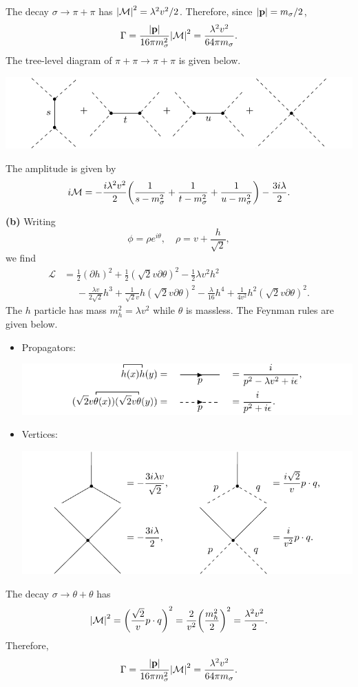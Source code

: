 \documentclass{article}
\makeatletter
\newcommand*{\shifttext}[1]{%
  \settowidth{\@tempdima}{#1}%
  \hspace{-\@tempdima}#1%
}
\newcommand{\plabel}[1]{%
\shifttext{\textbf{#1}\quad}%
}
\makeatother
\begin{document}
The decay $\sigma \rightarrow \pi + \pi$ has $\abs{\mathcal{M}}^2 = \lambda^2 v^2/2$.
Therefore, since $\abs{\vb{p}} = m_\sigma/2$,
\[ \Gamma = \frac{\abs{\vb{p}}}{16 \pi m_\sigma^2} \abs{\mathcal{M}}^2 = \frac{\lambda^2 v^2}{64\pi m_\sigma}. \]
The tree-level diagram of $\pi+\pi\rightarrow \pi+\pi$ is given below.
\begin{center}
    \includegraphics{img/cartesian/scatter/scalar.pdf}
\end{center}
The amplitude is given by
\[ i\mathcal{M} = -\frac{i\lambda^2 v^2}{2}\qty(\frac{1}{s - m_\sigma^2} + \frac{1}{t - m_\sigma^2} + \frac{1}{u - m_\sigma^2}) - \frac{3i\lambda}{2}. \]

\plabel{(b)}%
Writing
\[ \phi = \rho e^{i\theta}, \quad \rho = v + \frac{h}{\sqrt{2}}, \]
we find
\begin{align*}
    \mathcal{L} &= \frac{1}{2}(\partial h)^2 + \frac{1}{2}(\sqrt{2}v \partial \theta)^2 - \frac{1}{2}\lambda v^2 h^2 \\
    &\phantom{{}={}} - \frac{\lambda v}{2\sqrt{2}} h^3 + \frac{1}{\sqrt{2}v} h (\sqrt{2}v \partial \theta)^2 - \frac{\lambda}{16} h^4 + \frac{1}{4v^2} h^2 (\sqrt{2}v\partial \theta)^2.
\end{align*}
The $h$ particle has mass $m_h^2 = \lambda v^2$ while $\theta$ is massless.
The Feynman rules are given below.
\begin{itemize}
    \item Propagators:
    \begin{center}
        \includegraphics{img/polar/propagator/propagator.pdf}
    \end{center}
    \item Vertices:
    \begin{center}
        \includegraphics{img/polar/vertex/vertex.pdf}
    \end{center}
\end{itemize}
The decay $\sigma\rightarrow\theta + \theta$ has
\[ \abs{\mathcal{M}}^2 = \qty(\frac{\sqrt{2}}{v} p\cdot q)^2 = \frac{2}{v^2}\qty(\frac{m_h^2}{2})^2 = \frac{\lambda^2 v^2}{2}. \]
Therefore,
\[ \Gamma = \frac{\abs{\vb{p}}}{16 \pi m_\sigma^2} \abs{\mathcal{M}}^2 = \frac{\lambda^2 v^2}{64\pi m_\sigma}. \]
\end{document}

